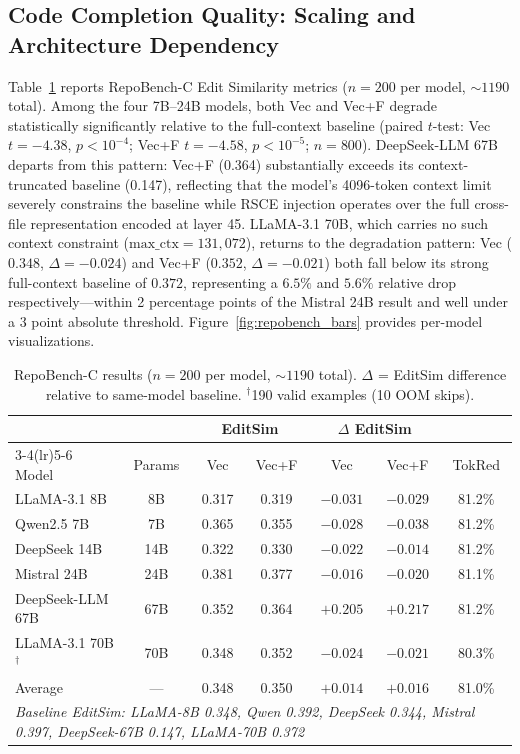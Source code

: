 \documentclass[11pt]{article}
\begin{document}
\subsection{Code Completion Quality: Scaling and Architecture Dependency}
\label{sec:code_results}
Table~\ref{tab:repobench} reports RepoBench-C Edit Similarity metrics ($n = 200$ per model, ${\sim}1190$ total). Among the four 7B--24B models, both Vec and Vec+F degrade statistically significantly relative to the full-context baseline (paired $t$-test: Vec $t = -4.38$, $p < 10^{-4}$; Vec+F $t = -4.58$, $p < 10^{-5}$; $n = 800$). DeepSeek-LLM 67B departs from this pattern: Vec+F (0.364) substantially exceeds its context-truncated baseline (0.147), reflecting that the model's 4096-token context limit severely constrains the baseline while RSCE injection operates over the full cross-file representation encoded at layer 45. LLaMA-3.1 70B, which carries no such context constraint ($\text{max\_ctx} = 131{,}072$), returns to the degradation pattern: Vec ($0.348$, $\Delta = -0.024$) and Vec+F ($0.352$, $\Delta = -0.021$) both fall below its strong full-context baseline of $0.372$, representing a $6.5\%$ and $5.6\%$ relative drop respectively---within 2 percentage points of the Mistral 24B result and well under a $3$ point absolute threshold. Figure~\ref{fig:repobench_bars} provides per-model visualizations.

\begin{table}[h]
\centering
\caption{RepoBench-C results ($n = 200$ per model, ${\sim}1190$ total). $\Delta$ = EditSim difference relative to same-model baseline. $^\dagger$190 valid examples (10 OOM skips).}
\label{tab:repobench}
\begin{tabular}{lcccccc}
\toprule
& & \multicolumn{2}{c}{EditSim} & \multicolumn{2}{c}{$\Delta$ EditSim} & \\
\cmidrule(lr){3-4}\cmidrule(lr){5-6}
Model & Params & Vec & Vec+F & Vec & Vec+F & TokRed \\
\midrule
LLaMA-3.1 8B    & 8B  & 0.317 & 0.319 & $-0.031$ & $-0.029$ & 81.2\% \\
Qwen2.5 7B      & 7B  & 0.365 & 0.355 & $-0.028$ & $-0.038$ & 81.2\% \\
DeepSeek 14B    & 14B & 0.322 & 0.330 & $-0.022$ & $-0.014$ & 81.2\% \\
Mistral 24B     & 24B & 0.381 & 0.377 & $-0.016$ & $-0.020$ & 81.1\% \\
DeepSeek-LLM 67B & 67B & 0.352 & 0.364 & $+0.205$ & $+0.217$ & 81.2\% \\
LLaMA-3.1 70B$^\dagger$ & 70B & 0.348 & 0.352 & $-0.024$ & $-0.021$ & 80.3\% \\
\midrule
Average         & --- & 0.348 & 0.350 & $+0.014$ & $+0.016$ & 81.0\% \\
\midrule
\multicolumn{7}{l}{\textit{Baseline EditSim: LLaMA-8B 0.348, Qwen 0.392, DeepSeek 0.344, Mistral 0.397, DeepSeek-67B 0.147, LLaMA-70B 0.372}} \\
\bottomrule
\end{tabular}
\end{table}
\end{document}
